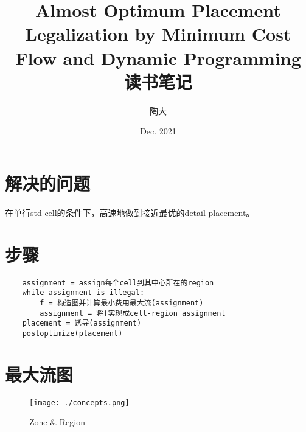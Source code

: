 \documentclass[UTF8,a4paper]{ctexart}
\title{Almost Optimum Placement Legalization by Minimum Cost Flow and Dynamic Programming\\
    读书笔记}
\author{陶大}
\date{Dec. 2021}
\begin{document}
\maketitle
\tableofcontents

\section{解决的问题}

在单行std cell的条件下，高速地做到接近最优的detail placement。

\section{步骤}

\begin{verbatim}
    assignment = assign每个cell到其中心所在的region
    while assignment is illegal:
        f = 构造图并计算最小费用最大流(assignment)
        assignment = 将f实现成cell-region assignment
    placement = 诱导(assignment)
    postoptimize(placement)
\end{verbatim}

\section{最大流图}

\begin{figure}
    \begin{center}
        \texttt{[image: ./concepts.png]}
    \end{center}
    \caption{Zone \& Region}
\end{figure}
\end{document}
